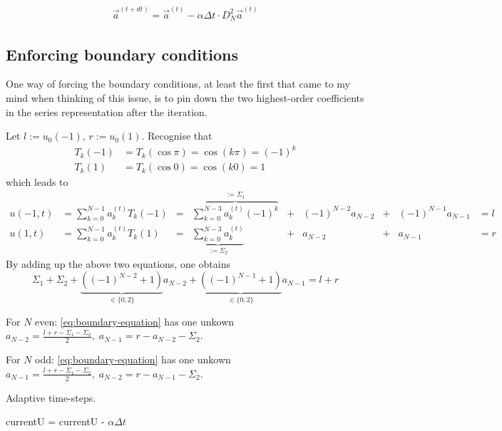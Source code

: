 \documentclass[12pt, a4paper]{article}
\begin{document}
  \begin{align*}
    \vec{a}^{(t+dt)} = \vec{a}^{(t)} - \alpha \Delta t \cdot D_N^2 \vec{a}^{(t)}
  \end{align*}

  \subsection{Enforcing boundary conditions}
  One way of forcing the boundary conditions, at least the first that came to my mind when thinking of this issue, is to pin down the two highest-order coefficients in the series representation after the iteration.

  Let $l := u_0(-1)$, $r := u_0(1)$.
  Recognise that
  \begin{align*}
    T_k(-1) & = T_k(\cos \pi) = \cos(k \pi) = (-1)^k \\
    T_k(1)  & = T_k(\cos 0) = \cos(k 0) = 1
  \end{align*}
  which leads to
  \begin{align*}
    u(-1, t) & = \sum_{k=0}^{N-1} a_k^{(t)} T_k(-1) & = & \overbrace{\sum_{k=0}^{N-3} a_k^{(t)} (-1)^k}^{:= \Sigma_1} & + & (-1)^{N-2} a_{N-2} & + & (-1)^{N-1} a_{N-1} & = l \\
    u(1, t)  & = \sum_{k=0}^{N-1} a_k^{(t)} T_k(1)  & = & \underbrace{\sum_{k=0}^{N-3} a_k^{(t)}}_{:= \Sigma_2}       & + & a_{N-2}            & + & a_{N-1}            & = r
  \end{align*}
  By adding up the above two equations, one obtains
  \begin{equation}
    \Sigma_1 + \Sigma_2 + \underbrace{\left((-1)^{N-2} + 1\right)}_{\in \{0, 2\}} a_{N-2} + \underbrace{\left((-1)^{N-1} + 1\right)}_{\in \{0, 2\}} a_{N-1} = l + r \label{eq:boundary-equation}
  \end{equation}

  For $N$ even: \autoref{eq:boundary-equation} has one unkown $a_{N-2} = \frac{l+r-\Sigma_1-\Sigma_2}{2},\; a_{N-1} = r - a_{N-2} - \Sigma_2$.

  For $N$ odd: \autoref{eq:boundary-equation} has one unkown $a_{N-1} = \frac{l+r-\Sigma_1-\Sigma_2}{2},\; a_{N-2} = r - a_{N-1} - \Sigma_2$.

  Adaptive time-steps.

  \begin{algorithm}[language=pseudo,caption={Heat Equation Forward-Euler}]
    currentU = currentU - $\alpha \Delta t$
  \end{algorithm}
\end{document}
